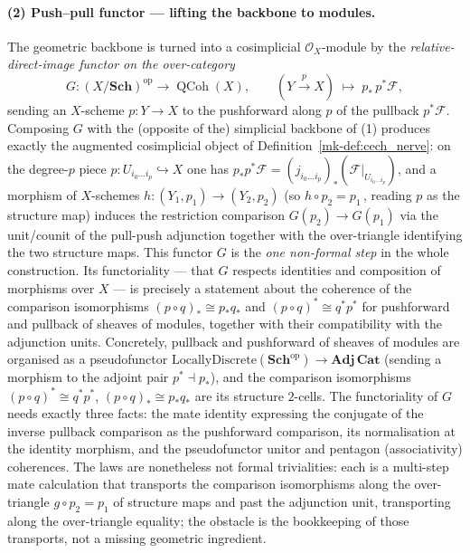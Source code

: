 \paragraph{(2) Push--pull functor — lifting the backbone to modules.}
The geometric backbone is turned into a cosimplicial \(\mathcal{O}_X\)-module by
the \emph{relative-direct-image functor on the over-category}
\[
  G : (X/\mathbf{Sch})^{\mathrm{op}} \longrightarrow \operatorname{QCoh}(X),
  \qquad
  (Y \xrightarrow{\,p\,} X) \;\longmapsto\; p_*\, p^*\mathcal{F},
\]
sending an \(X\)-scheme \(p : Y \to X\) to the pushforward along \(p\) of the
pullback \(p^*\mathcal{F}\). Composing \(G\) with the (opposite of the) simplicial
backbone of (1) produces exactly the augmented cosimplicial object of
Definition~\ref{mk-def:cech_nerve}: on the degree-\(p\) piece
\(p : U_{i_0 \ldots i_p} \hookrightarrow X\) one has
\(p_* p^*\mathcal{F} = (j_{i_0 \ldots i_p})_*(\mathcal{F}|_{U_{i_0 \ldots i_p}})\),
and a morphism of \(X\)-schemes \(h : (Y_1, p_1) \to (Y_2, p_2)\) (so
\(h \circ p_2 = p_1\)\,, reading \(p\) as the structure map) induces the
restriction comparison \(G(p_2) \to G(p_1)\) via the unit/counit of the
pull-push adjunction together with the over-triangle identifying the two
structure maps. This functor \(G\) is the \emph{one non-formal step} in the whole
construction. Its functoriality --- that \(G\) respects identities and composition
of morphisms over \(X\) --- is precisely a statement about the coherence of the
comparison isomorphisms \((p \circ q)_* \cong p_* q_*\) and
\((p \circ q)^* \cong q^* p^*\) for pushforward and pullback of sheaves of
modules, together with their compatibility with the adjunction units. Concretely,
pullback and pushforward of sheaves of modules are organised as a
pseudofunctor \(\mathrm{LocallyDiscrete}(\mathbf{Sch}^{\mathrm{op}}) \to
\mathbf{Adj}\,\mathbf{Cat}\) (sending a morphism to the adjoint pair
\(p^* \dashv p_*\)), and the comparison isomorphisms
\((p \circ q)^* \cong q^* p^*\), \((p \circ q)_* \cong p_* q_*\) are its structure
\(2\)-cells. The functoriality of \(G\) needs exactly three facts: the mate identity
expressing the conjugate of the inverse pullback comparison as the pushforward
comparison, its normalisation at the identity morphism, and the pseudofunctor
unitor and pentagon (associativity) coherences. The laws are nonetheless not formal
trivialities: each is a multi-step mate calculation that transports the comparison
isomorphisms along the over-triangle \(g \circ p_2 = p_1\) of structure maps and
past the adjunction unit, transporting along the over-triangle equality; the
obstacle is the bookkeeping of those transports, not a missing geometric ingredient.


